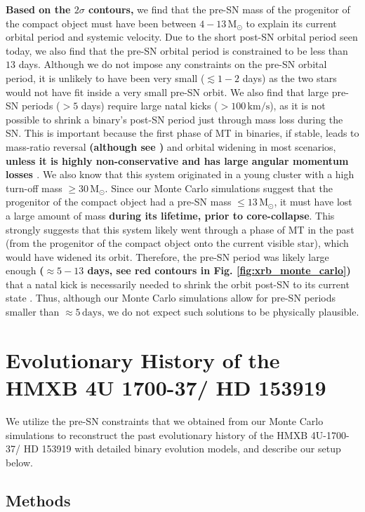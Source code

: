 \documentclass[linenumbers,trackchanges,twocolumn]{aastex701}
\newcommand{\Mdot}{\mathrm{M}_{\odot}}
\begin{document}
\textbf{Based on the $2\sigma$ contours,} we find that the pre-SN mass of the progenitor of the compact object must have been between $4-13\,\Mdot$ to explain its current orbital period and systemic velocity. Due to the short post-SN orbital period seen today, we also find that the pre-SN orbital period is constrained to be less than $13$ days. Although we do not impose any constraints on the pre-SN orbital period, it is unlikely to have been very small ($\lesssim 1-2$ days) as the two stars would not have fit inside a very small pre-SN orbit. We also find that large pre-SN periods ($>5$ days) require large natal kicks ($>100 \, \mathrm{km/s}$), as it is not possible to shrink a binary's post-SN period just through mass loss during the SN. This is important because the first phase of MT in binaries, if stable, leads to mass-ratio reversal \textbf{(although see \citealp{2023A&A...672A.198S})} and orbital widening in most scenarios, \textbf{unless it is highly non-conservative and has large angular momentum losses \citep{2019A&A...624A..66R}}. We also know that this system originated in a young cluster with a high turn-off mass $\geq 30\,\Mdot$. Since our Monte Carlo simulations suggest that the progenitor of the compact object had a pre-SN mass $\leq 13\,\Mdot$, it must have lost a large amount of mass \textbf{during its lifetime, prior to core-collapse}. This strongly suggests that this system likely went through a phase of MT in the past (from the progenitor of the compact object onto the current visible star), which would have widened its orbit. Therefore, the pre-SN period was likely large enough \textbf{($\approx 5-13$ days, see red contours in Fig. \ref{fig:xrb_monte_carlo})} that a natal kick is necessarily needed to shrink the orbit post-SN to its current state \citep{2021A&A...655A..31V}. Thus, although our Monte Carlo simulations allow for pre-SN periods smaller than $\approx 5\,\mathrm{days}$, we do not expect such solutions to be physically plausible.

\section{Evolutionary History of the HMXB 4U 1700-37/ HD 153919} \label{xrb}

We utilize the pre-SN constraints that we obtained from our Monte Carlo simulations to reconstruct the past evolutionary history of the HMXB 4U-1700-37/ HD 153919 with detailed binary evolution models, and describe our setup below.

\subsection{Methods} \label{sec:mesa_xrb-methods}
\end{document}
